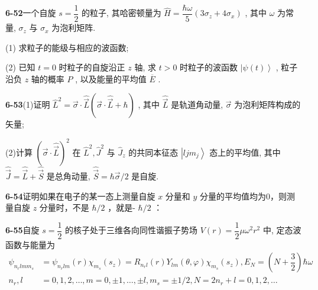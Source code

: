 \vfill

\newpage

\textbf{6-52}\quad 一个自旋 $\displaystyle s = \dfrac{1}{2}$ 的粒子, 其哈密顿量为 $\displaystyle \hat{H} = \dfrac{\hbar\omega}{5}(3\sigma_z + 4\sigma_x)$ , 其中 $\displaystyle \omega$ 为常量, $\displaystyle \sigma_z$ 与 $\displaystyle \sigma_x$ 为泡利矩阵.

(1) 求粒子的能级与相应的波函数;

(2) 已知 $\displaystyle t = 0$ 时粒子的自旋沿正 $\displaystyle z$ 轴, 求 $\displaystyle t > 0$ 时粒子的波函数 $\displaystyle \left|\psi(t)\right\rangle$ , 粒子沿负 $\displaystyle z$ 轴的概率 $\displaystyle P$ , 以及能量的平均值 $\displaystyle \overline{E}$ .

\vfill

\newpage

\textbf{6-53}\quad (1)证明 $\displaystyle \hat{L}^2 = \vec{\sigma} \cdot \hat{\vec{L}} (\vec{\sigma} \cdot \hat{\vec{L}} +\hbar)$ , 其中 $\displaystyle \hat{\vec{L}}$ 是轨道角动量, $\displaystyle \vec{\sigma}$ 为泡利矩阵构成的矢量;

(2)计算 $\displaystyle (\vec{\sigma}\cdot \hat{\vec{L}})^2$ 在 $\displaystyle \hat{L}^2,\hat{J}^2$ 与 $\displaystyle \hat{J}_z$ 的共同本征态 $\displaystyle \left|ljm_j\right\rangle$ 态上的平均值, 其中 $\displaystyle \hat{\vec{J}} = \hat{\vec{L}} +\hat{\vec{S}}$ 是总角动量, $\displaystyle \hat{\vec{S}} = \hbar \vec{\sigma} /2$ 是自旋.

\vfill

\newpage

\textbf{6-54}\quad 证明如果在电子的某一态上测量自旋 $\displaystyle x$ 分量和 $\displaystyle y$ 分量的平均值均为0，则测量自旋 $\displaystyle z$ 分量时，不是 $\displaystyle \hbar /2$ ，就是- $\displaystyle \hbar /2$ ：

\vfill

\newpage

\textbf{6-55}\quad 自旋 $\displaystyle s = \dfrac{1}{2}$ 的核子处于三维各向同性谐振子势场 $\displaystyle V(r) = \dfrac{1}{2}\mu \omega^2 r^2$ 中, 定态波函数与能量为
\begin{eqnarray*}
    \psi_ {n _ {r} l m m _ {s}} &= \psi_ {n _ {r} l m} (r) \chi_ {m _ {s}} (s _ {z}) = R _ {n _ {r} l} (r) Y _ {l m} (\theta , \varphi) \chi_ {m _ {s}} (s _ {z}), E _ {N} = \left(N + \dfrac {3}{2}\right) \hbar \omega\\
    n _ {r}, l &= 0, 1, 2, \dots , m = 0, \pm 1, \dots , \pm l, m _ {s} = \pm 1 / 2, N = 2 n _ {r} + l = 0, 1, 2, \dots
\end{eqnarray*}

